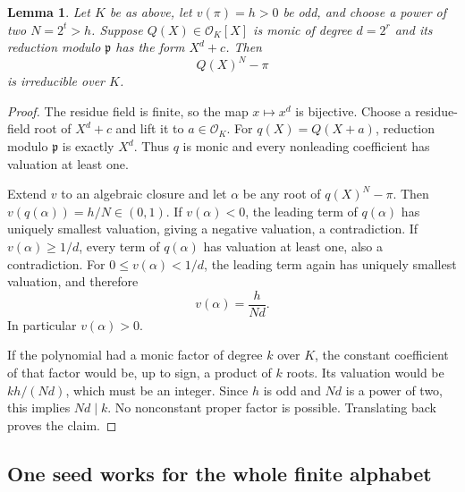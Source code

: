 \documentclass[11pt,letterpaper]{article}
\numberwithin{equation}{section}
\newtheorem{lemma}[theorem]{Lemma}
\theoremstyle{definition}
\newcommand{\OK}{\mathcal O_K}
\begin{document}
\begin{lemma}\label{lem:irreducible}
Let $K$ be as above, let $v(\pi)=h>0$ be odd, and choose a power of two
$N=2^t>h$. Suppose $Q(X)\in\OK[X]$ is monic of degree $d=2^r$ and
its reduction modulo $\mathfrak p$ has the form $X^d+c$. Then
\begin{equation}\label{eq:irreducible}
 Q(X)^N-\pi
\end{equation}
is irreducible over $K$.
\end{lemma}
\begin{proof}
The residue field is finite, so the map $x\mapsto x^d$ is bijective.
Choose a residue-field root of $X^d+c$ and lift it to $a\in\OK$.
For $q(X)=Q(X+a)$, reduction modulo $\mathfrak p$ is exactly $X^d$.
Thus $q$ is monic and every nonleading coefficient has valuation at least one.

Extend $v$ to an algebraic closure and let $\alpha$ be any root of
$q(X)^N-\pi$. Then $v(q(\alpha))=h/N\in(0,1)$.
If $v(\alpha)<0$, the leading term of $q(\alpha)$ has uniquely smallest
valuation, giving a negative valuation, a contradiction.
If $v(\alpha)\ge1/d$, every term of $q(\alpha)$ has valuation at least one,
also a contradiction. For $0\le v(\alpha)<1/d$, the leading term again has
uniquely smallest valuation, and therefore
\begin{equation}\label{eq:rootvaluation}
 v(\alpha)=\frac{h}{Nd}.
\end{equation}
In particular $v(\alpha)>0$.

If the polynomial had a monic factor of degree $k$ over $K$, the constant
coefficient of that factor would be, up to sign, a product of $k$ roots.
Its valuation would be $kh/(Nd)$, which must be an integer.
Since $h$ is odd and $Nd$ is a power of two, this implies $Nd\mid k$.
No nonconstant proper factor is possible. Translating back proves the claim.
\end{proof}

\subsection{One seed works for the whole finite alphabet}
\end{document}
